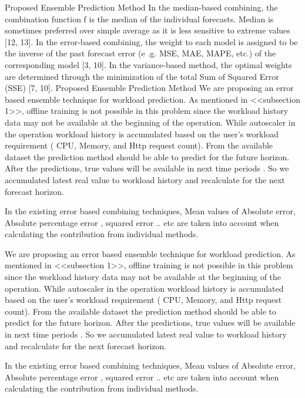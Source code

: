 Proposed Ensemble Prediction Method
In the median-based combining, the combination function f is the median of the individual forecasts. Median is 
sometimes preferred over simple average as it is less sensitive to extreme values [12, 13].
In the error-based combining, the weight to each model is assigned to be the inverse of the past forecast error (e
.g. MSE, MAE, MAPE, etc.) of the corresponding model [3, 10].
In the variance-based method, the optimal weights are determined through the minimization of the total Sum of 
Squared Error (SSE) [7, 10].
Proposed Ensemble Prediction Method
We are proposing an error based ensemble technique for workload prediction. As mentioned in <<subsection 1>>, 
offline training is not possible in this problem since the  workload history data may not be available at the 
beginning of the operation. While autoscaler in the operation workload history  is accumulated based on the user's 
workload requirement ( CPU, Memory, and Http request count). From the available dataset the prediction method 
should be able to predict for the future horizon. After the predictions, true values will be available in next time 
periods . So we accumulated latest real value to workload history and recalculate for the next forecast horizon. 
        
    In the existing error based combining techniques, Mean values of Absolute error, Absolute percentage error , 
squared error .. etc are taken into account when calculating the contribution from individual methods. 


We are proposing an error based ensemble technique for workload prediction. As mentioned in <<subsection 1>>, offline training is not possible in this problem since the  workload history data may not be available at the beginning of the operation. While autoscaler in the operation workload history  is accumulated based on the user's workload requirement ( CPU, Memory, and Http request count). From the available dataset the prediction method should be able to predict for the future horizon. After the predictions, true values will be available in next time periods . So we accumulated latest real value to workload history and recalculate for the next forecast horizon. 
		
	In the existing error based combining techniques, Mean values of Absolute error, Absolute percentage error , squared error .. etc are taken into account when calculating the contribution from individual methods. 






